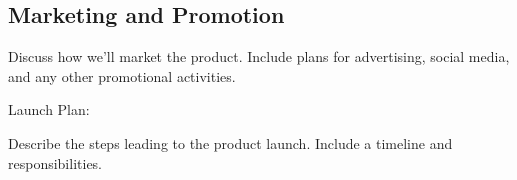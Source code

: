 
\subsection{Marketing and Promotion}

Discuss how we'll market the product.
Include plans for advertising, social media, and any other promotional activities.

Launch Plan:

    Describe the steps leading to the product launch.
    Include a timeline and responsibilities.
